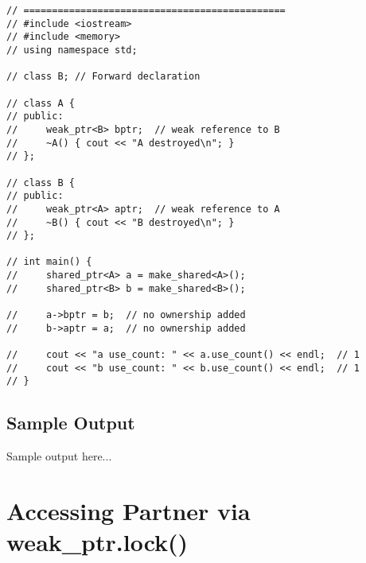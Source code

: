 \documentclass[12pt]{article}
\begin{document}
\begin{Verbatim}[fontsize=\small,frame=single]
// ==============================================
// #include <iostream>
// #include <memory>
// using namespace std;

// class B; // Forward declaration

// class A {
// public:
//     weak_ptr<B> bptr;  // weak reference to B
//     ~A() { cout << "A destroyed\n"; }
// };

// class B {
// public:
//     weak_ptr<A> aptr;  // weak reference to A
//     ~B() { cout << "B destroyed\n"; }
// };

// int main() {
//     shared_ptr<A> a = make_shared<A>();
//     shared_ptr<B> b = make_shared<B>();

//     a->bptr = b;  // no ownership added
//     b->aptr = a;  // no ownership added

//     cout << "a use_count: " << a.use_count() << endl;  // 1
//     cout << "b use_count: " << b.use_count() << endl;  // 1
// }
\end{Verbatim}

\subsection*{Sample Output}
\begin{tcolorbox}[colback=black!5!white,colframe=black!75!white]
Sample output here...
\end{tcolorbox}
\newpage

\section*{Accessing Partner via weak_ptr.lock()}
\end{document}
